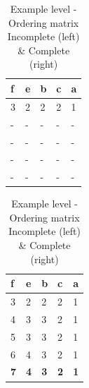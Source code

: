 \begin{table}[h!]
  \caption{\label{tab:example_matrix}\centering Example level - Ordering matrix \break Incomplete (left) \& Complete (right)}
	\begin{minipage}{.5\linewidth}
    \centering
    \begin{tabular}{@{}lllll@{}}
		\toprule
		\textbf{f} & \textbf{e} & \textbf{b} & \textbf{c} & \textbf{a} \\ \midrule
		3          & 2          & 2          & 2          & 1          \\
		-          & -          & -          & -          & -          \\
		-          & -          & -          & -          & -          \\
		-          & -          & -          & -          & -          \\
		-          & -          & -          & -          & -          \\ \bottomrule
		\end{tabular}
  \end{minipage}%
  \begin{minipage}{.5\linewidth}
    \centering
    \begin{tabular}{@{}lllll@{}}
		\toprule
		\textbf{f} & \textbf{e} & \textbf{b} & \textbf{c} & \textbf{a} \\ \midrule
		3          & 2          & 2          & 2          & 1          \\
		4          & 3          & 3          & 2          & 1          \\
		5          & 3          & 3          & 2          & 1          \\
		6          & 4          & 3          & 2          & 1          \\ \midrule
		\textbf{7} & \textbf{4} & \textbf{3} & \textbf{2} & \textbf{1} \\ \bottomrule
		\end{tabular}
  \end{minipage}
\end{table}

